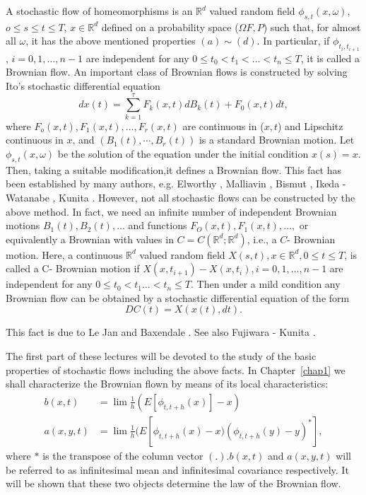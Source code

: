 A stochastic flow of homeomorphisms is an $\mathbb{R}^d$ valued random
field $\phi_{s,t}(x, \omega)$, $o \le s \le t \le T$, $x  \in
\mathbb{R}^d$ defined on a probability space ($\Omega F, P$) such that,
for almost all $\omega$, it has the above mentioned properties $(a)
\sim (d)$. In particular, if $\phi_{t_i, t_{i+1}}$, $i = 0, 1, \ldots, 
n - 1$ are independent for any $0 \le t_0 < t_1 < \ldots < t_n \le T$,
it is called a Brownian flow.  An important class of Brownian flows is
constructed by solving Ito's stochastic differential equation 
\begin{equation*}
  dx (t) = \sum^\tau_{k = 1} F_k (x,t) 
d B_k(t) + F_0(x,t)dt, \tag{0.2}\label{c0:eq0.2}
\end{equation*}
where $F_o(x,t),F_1(x,t),\ldots,  F_r(x,t)$ are continuous in ($x,t$)
and Lipschitz continuous in $x$, and $(B_1(t), \cdots,  B_r(t))$ is a
standard Brownian motion. Let $\phi_{s,t}(x, \omega)$ be the solution
of the equation under the initial condition $x(s) = x$. Then, taking a
suitable modification,\pageoriginale it defines a Brownian flow. This fact has been
established by many authors, e.g. Elworthy \cite{7}, Malliavin \cite{8},
Bismut \cite{3}, Ikeda - Watanabe \cite{13}, Kunita \cite{18} . However, not all
stochastic flows can be constructed by the above method. In fact, we
need an infinite number of independent Brownian motions $B_1(t),
B_2(t), \ldots$ and functions $F_O(x,t), F_1(x,t), \ldots, $ or
equivalently a Brownian with values in $C = C (\mathbb{R}^d ;
\mathbb{R}^d)$, i.e., a $C$- Brownian motion. Here, a continuous
$\mathbb{R}^d$ valued random field $X(s,t), x \in \mathbb{R}^d,  0 \le
t \le T$, is called a C- Brownian motion if $X(x,t_{i+1}) -
X(x,t_{i}), i = 0, 1, \ldots,  n - 1 $ are independent for any $0 \le
t_0 < t_1 \ldots < t_n \le T$. Then under a mild condition any
Brownian flow can be obtained by a stochastic differential equation of
the form  
\begin{equation*}
DC(t) = X(x(t), dt). \tag{0.3}\label{c0:eq0.3}
\end{equation*} 
 
  This fact is due to Le Jan \cite{23} and Baxendale \cite{1}. See also
  Fujiwara - Kunita \cite{8}.  
 
 The first part of these lectures will be devoted to the study of the
 basic properties of stochastic flows including the above facts. In
 Chapter~\ref{chap1} we shall characterize the Brownian flown by means of its
 local characteristics: 
 \begin{align*}
   b(x,t) & = \lim \frac{1}{h} (E [\phi_{t,t +h}(x)] - x)  \tag{0.4}\label{c0:eq0.4}\\
   a(x,y,t) & = \lim \frac{1}{h} (E [\phi_{t,t +h}(x) -x) (\phi_{t,t
       +h}(y) -y)^* ], 
 \end{align*}  
 where $*$ is the transpose of the column vector $(.). b(x,t)$ and
 $a(x,y,t)$ will be referred to as infinitesimal mean and
 infinitesimal covariance respectively. It will be shown that these
 two objects determine the law of the Brownian flow. 
 
